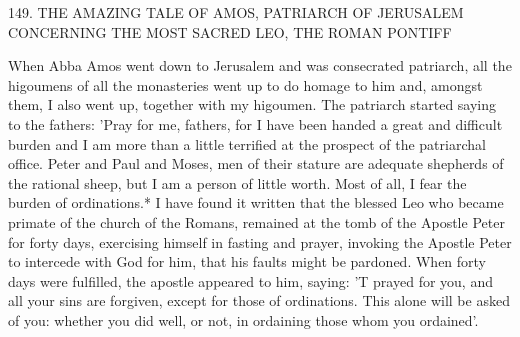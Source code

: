 149. THE AMAZING TALE OF AMOS,
PATRIARCH OF JERUSALEM
CONCERNING THE MOST SACRED LEO,
THE ROMAN PONTIFF

When Abba Amos went down to Jerusalem and was consecrated
patriarch, all the higoumens of all the monasteries went up to do
homage to him and, amongst them, I also went up, together with
my higoumen. The patriarch started saying to the fathers: 'Pray for
me, fathers, for I have been handed a great and difficult burden and
I am more than a little terrified at the prospect of the patriarchal
office. Peter and Paul and Moses, men of their stature are adequate
shepherds of the rational sheep, but I am a person of little worth.
Most of all, I fear the burden of ordinations.* I have found it
written that the blessed Leo who became primate of the church of
the Romans, remained at the tomb of the Apostle Peter for forty
days, exercising himself in fasting and prayer, invoking the Apostle
Peter to intercede with God for him, that his faults might be
pardoned. When forty days were fulfilled, the apostle appeared to
him, saying: 'T prayed for you, and all your sins are forgiven, except
for those of ordinations. This alone will be asked of you: whether
you did well, or not, in ordaining those whom you ordained'.


